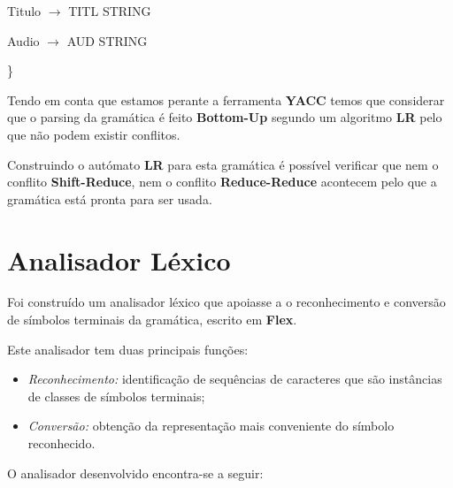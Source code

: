 \documentclass[11pt,a4paper]{report}
\begin{document}
\vspace{0.2cm}
\hspace{1.0cm} Titulo $\rightarrow$ TITL STRING

\vspace{0.2cm}
\hspace{1.0cm} Audio $\rightarrow$ AUD STRING


\hspace{0.7cm} \}

\vspace{0.5cm}

Tendo em conta que estamos perante a ferramenta \textbf{YACC} temos que considerar que o parsing da gramática é feito \textbf{Bottom-Up} segundo um algoritmo \textbf{LR} pelo que não podem existir conflitos.

Construindo o autómato \textbf{LR} para esta gramática é possível verificar que nem o conflito \textbf{Shift-Reduce}, nem o conflito \textbf{Reduce-Reduce} acontecem pelo que a gramática está pronta para ser usada.


\newpage

\section{Analisador Léxico}

Foi construído um analisador léxico que apoiasse a o reconhecimento e conversão de símbolos terminais da gramática, escrito em \textbf{Flex}.

Este analisador tem duas principais funções:

\begin{itemize}
	\item \textit{Reconhecimento:} identificação de sequências de caracteres que são instâncias de classes de símbolos terminais;
	\item \textit{Conversão:} obtenção da representação mais conveniente do símbolo reconhecido.
\end{itemize}

O analisador desenvolvido encontra-se a seguir:

\vspace{0.5cm}
\end{document}
